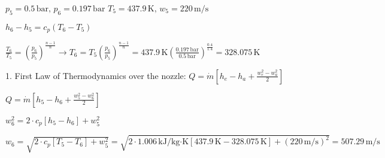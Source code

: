 \( p_5 = 0.5 \, \text{bar}, \, p_6 = 0.197 \, \text{bar} \)  
\( T_5 = 437.9 \, \text{K}, \, w_5 = 220 \, \text{m/s} \)  

\( h_6 - h_5 = c_p (T_6 - T_5) \)  

\( \frac{T_6}{T_5} = \left( \frac{p_6}{p_5} \right)^{\frac{n-1}{n}} \rightarrow T_6 = T_5 \left( \frac{p_6}{p_5} \right)^{\frac{n-1}{n}} = 437.9 \, \text{K} \left( \frac{0.197 \, \text{bar}}{0.5 \, \text{bar}} \right)^{\frac{0.4}{1.4}} = 328.075 \, \text{K} \)  

1. First Law of Thermodynamics over the nozzle:  
\( Q = \dot{m} \left[ h_e - h_a + \frac{w_e^2 - w_a^2}{2} \right] \)  

\( Q = \dot{m} \left[ h_5 - h_6 + \frac{w_5^2 - w_6^2}{2} \right] \)  

\( w_6^2 = 2 \cdot c_p \left[ h_5 - h_6 \right] + w_5^2 \)  

\( w_6 = \sqrt{2 \cdot c_p \left[ T_5 - T_6 \right] + w_5^2} = \sqrt{2 \cdot 1.006 \, \text{kJ/kg·K} \left[ 437.9 \, \text{K} - 328.075 \, \text{K} \right] + (220 \, \text{m/s})^2} = 507.29 \, \text{m/s} \)